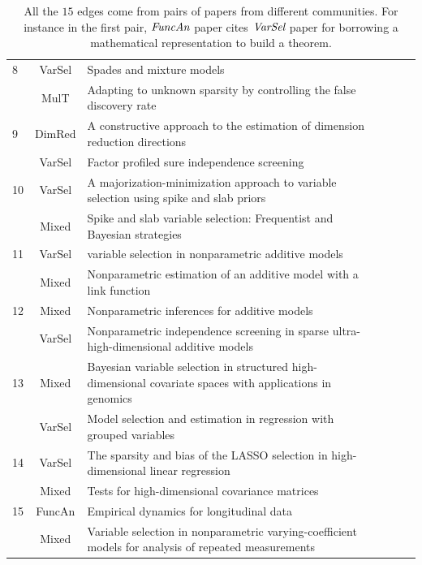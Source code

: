 \documentclass[AMS,STIX1COL]{WileyNJD-v2}
\begin{document}
{\begin{table}[htbp]
\begin{tabular}{lclclcl}
8    & VarSel    & Spades and mixture models & \\
     & MulT      & Adapting to unknown sparsity by controlling the false discovery rate                          & \\
9    & DimRed    & A constructive approach to the estimation of dimension reduction directions                   & \\
     & VarSel    & Factor profiled sure independence screening & \\
10   & VarSel    & A majorization-minimization approach to variable selection using spike and slab priors        & \\
     & Mixed     & Spike and slab variable selection: Frequentist and Bayesian strategies                        & \\
11   & VarSel    & variable selection in nonparametric additive models & \\
     & Mixed     & Nonparametric estimation of an additive model with a link function                            & \\
12   & Mixed     & Nonparametric inferences for additive models & \\
     & VarSel    & Nonparametric independence screening in sparse ultra-high-dimensional additive models         & \\
13   & Mixed     & Bayesian variable selection in structured high-dimensional covariate spaces with applications in genomics & \\
     & VarSel    & Model selection and estimation in regression with grouped variables                           & \\
14   & VarSel    & The sparsity and bias of the LASSO selection in high-dimensional linear regression            & \\
     & Mixed     & Tests for high-dimensional covariance matrices & \\
15   & FuncAn    & Empirical dynamics for longitudinal data & \\
     & Mixed     & Variable selection in nonparametric varying-coefficient models for analysis of repeated measurements   &       \\\hline
\end{tabular}
\caption{All the $15$ edges come from pairs of papers from different communities. For instance in the first pair, $\emph{FuncAn}$ paper cites $\emph{VarSel}$ paper for borrowing a mathematical representation to build a theorem.}
\end{table}
\label{tab:table2}

}
\end{document}
